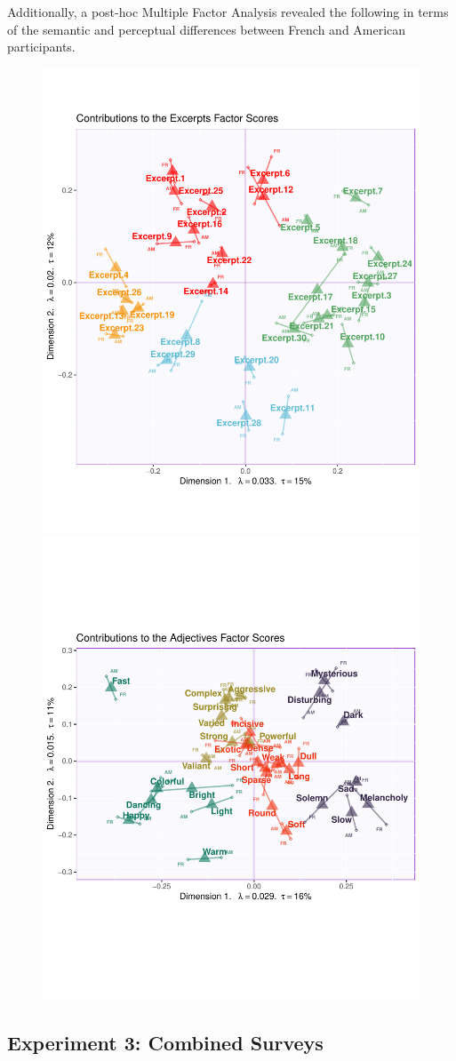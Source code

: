 \documentclass[
  english,
  man,floatsintext]{apa6}
\begin{document}
Additionally, a post-hoc Multiple Factor Analysis revealed the following in terms of the semantic and perceptual differences between French and American participants.

\begin{figure}

{\centering \includegraphics[width=0.45\linewidth]{Music-Descriptor-Space_files/figure-latex/mfasbs-1} \includegraphics[width=0.45\linewidth]{Music-Descriptor-Space_files/figure-latex/mfasbs-2} 

}

\caption{ }\label{fig:mfasbs}
\end{figure}

\hypertarget{experiment-3-combined-surveys}{%
\subsection{Experiment 3: Combined Surveys}\label{experiment-3-combined-surveys}}
\end{document}
